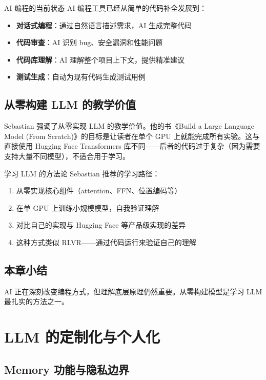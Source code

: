 \documentclass[a4paper]{article}
\begin{document}
\begin{knowledgebox}{AI 编程的当前状态}
AI 编程工具已经从简单的代码补全发展到：
\begin{itemize}
    \item \textbf{对话式编程}：通过自然语言描述需求，AI 生成完整代码
    \item \textbf{代码审查}：AI 识别 bug、安全漏洞和性能问题
    \item \textbf{代码库理解}：AI 理解整个项目上下文，提供精准建议
    \item \textbf{测试生成}：自动为现有代码生成测试用例
\end{itemize}
\end{knowledgebox}

\subsection{从零构建 LLM 的教学价值}

Sebastian 强调了从零实现 LLM 的教学价值。他的书《Build a Large Language Model (From Scratch)》的目标是让读者在单个 GPU 上就能完成所有实验。这与直接使用 Hugging Face Transformers 库不同——后者的代码过于复杂（因为需要支持大量不同模型），不适合用于学习。

\begin{importantbox}{学习 LLM 的方法论}
Sebastian 推荐的学习路径：
\begin{enumerate}
    \item 从零实现核心组件（attention、FFN、位置编码等）
    \item 在单 GPU 上训练小规模模型，自我验证理解
    \item 对比自己的实现与 Hugging Face 等产品级实现的差异
    \item 这种方式类似 RLVR——通过代码运行来验证自己的理解
\end{enumerate}
\end{importantbox}

\subsection{本章小结}

AI 正在深刻改变编程方式，但理解底层原理仍然重要。从零构建模型是学习 LLM 最扎实的方法之一。

\section{LLM 的定制化与个人化}

\subsection{Memory 功能与隐私边界}
\end{document}
